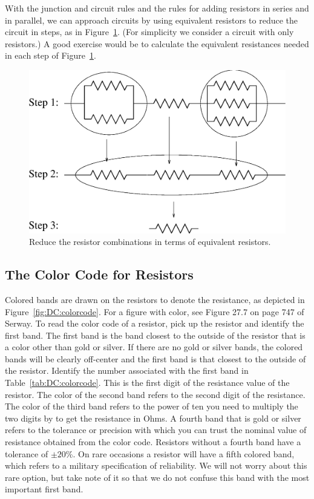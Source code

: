 With the junction and circuit rules and the rules for adding resistors in 
series and in parallel, we can approach circuits by using equivalent resistors 
to reduce the circuit in steps, as in Figure~\ref{fig:DC:resistreduce}. (For 
simplicity we consider a circuit with only resistors.)  
A good exercise would be to calculate the equivalent resistances needed in each
step of Figure~\ref{fig:DC:resistreduce}.  
\begin{figure}[htb]
\centering \epsfxsize=9cm \includegraphics[scale=0.6]{2_dc/resistreduce.eps}
\caption{Reduce the resistor combinations in terms of equivalent resistors.}
\label{fig:DC:resistreduce}
\end{figure}

\subsection{The Color Code for Resistors}

Colored bands are drawn on the resistors to denote the resistance, as 
depicted in Figure~\ref{fig:DC:colorcode}. 
For a figure with color, see Figure 27.7 on page 747 of Serway.
To read the color code of a resistor, pick up the resistor and identify the
first band. The first band is the band closest to the outside of the resistor 
that is a color other than gold or silver.  If there are no gold or silver 
bands, the colored bands will be clearly off-center and the first band is that 
closest to the outside of the resistor.  Identify the number associated
with the first band in Table~\ref{tab:DC:colorcode}. 
This is the first digit of the resistance value of the resistor.  The color of 
the second band refers to the second digit of the resistance. The color of the 
third band refers to the power of ten you need to multiply the two digits by 
to get the resistance in Ohms. A fourth band that is gold or silver refers to 
the tolerance or precision with which you can trust the nominal value of 
resistance obtained from the color code. Resistors without a fourth band have
a tolerance of $\pm 20$\%.  On rare occasions a resistor will have a fifth 
colored band, which refers to a military specification of reliability. We will 
not worry about this rare option, but take note of it so that we do not 
confuse this band with the most important first band. \\


